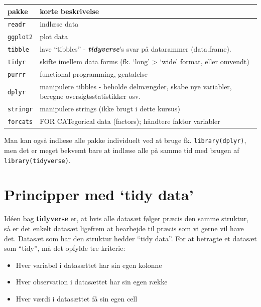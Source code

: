 \documentclass[
]{book}
\providecommand{\tightlist}{%
  \setlength{\itemsep}{0pt}\setlength{\parskip}{0pt}}
\begin{document}
\begin{longtable}[]{@{}
  >{\raggedright\arraybackslash}p{}
  >{\raggedright\arraybackslash}p{}@{}}
\toprule
pakke & korte beskrivelse \\
\midrule
\endhead
\texttt{readr} & indlæse data \\
\texttt{ggplot2} & plot data \\
\texttt{tibble} & lave ``tibbles'' - \textbf{\emph{tidyverse}}'s svar på datarammer (data.frame). \\
\texttt{tidyr} & skifte imellem data forms (fk. `long' \textgreater{} `wide' format, eller omvendt) \\
\texttt{purrr} & functional programming, gentalelse \\
\texttt{dplyr} & manipulere tibbles - beholde delmængder, skabe nye variabler, beregne oversigtsstatistikker osv. \\
\texttt{stringr} & manipulere strings (ikke brugt i dette kursus) \\
\texttt{forcats} & FOR CATegorical data (factors); håndtere faktor variabler \\
\bottomrule
\end{longtable}

Man kan også indlæse alle pakke individuelt ved at bruge fk. \texttt{library(dplyr)}, men det er meget bekvemt bare at indlæse alle på samme tid med brugen af \texttt{library(tidyverse)}.

\hypertarget{principper-med-tidy-data}{%
\section{Principper med `tidy data'}\label{principper-med-tidy-data}}

Idéen bag \textbf{tidyverse} er, at hvis alle datasæt følger præcis den samme struktur, så er det enkelt datasæt ligefrem at bearbejde til præcis som vi gerne vil have det. Datasæt som har den struktur hedder ``tidy data''. For at betragte et datasæt som ``tidy'', må det opfylde tre kriterie:

\begin{itemize}
\tightlist
\item
  Hver variabel i datasættet har sin egen kolonne
\item
  Hver observation i datasættet har sin egen række
\item
  Hver værdi i datasættet få sin egen cell
\end{itemize}
\end{document}
